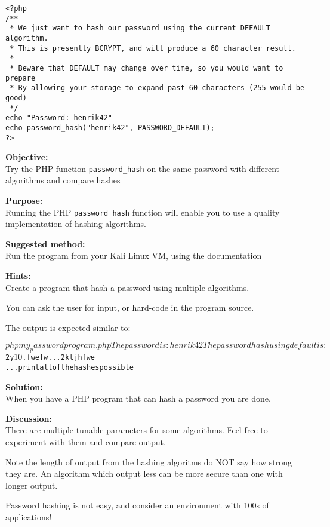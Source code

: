 \documentclass[a4paper,11pt,notitlepage]{report}
\begin{document}
\begin{verbatim}
<?php
/**
 * We just want to hash our password using the current DEFAULT algorithm.
 * This is presently BCRYPT, and will produce a 60 character result.
 *
 * Beware that DEFAULT may change over time, so you would want to prepare
 * By allowing your storage to expand past 60 characters (255 would be good)
 */
echo "Password: henrik42"
echo password_hash("henrik42", PASSWORD_DEFAULT);
?>
\end{verbatim}

{\bf Objective:}\\
Try the PHP function \verb+password_hash+ on the same password with different algorithms and compare hashes


{\bf Purpose:}\\
Running the PHP \verb+password_hash+ function will enable you to use a quality implementation of hashing algorithms.


{\bf Suggested method:}\\
Run the program from your Kali Linux VM, using the documentation\\


{\bf Hints:}\\
Create a program that hash a password using multiple algorithms.

You can ask the user for input, or hard-code in the program source.

The output is expected similar to:

\begin{alltt}
$ php my_passwordprogram.php
The password is: henrik42
The password hash using default is: $2y$10$.fwefw...2kljhfwe
... print all of the hashes possible
\end{alltt}


{\bf Solution:}\\
When you have a PHP program that can hash a password you are done.

{\bf Discussion:}\\
There are multiple tunable parameters for some algorithms. Feel free to experiment with them and compare output.

Note the length of output from the hashing algoritms do NOT say how strong they are. An algorithm which output less can be more secure than one with longer output.

Password hashing is not easy, and consider an environment with 100s of applications!
\end{document}
